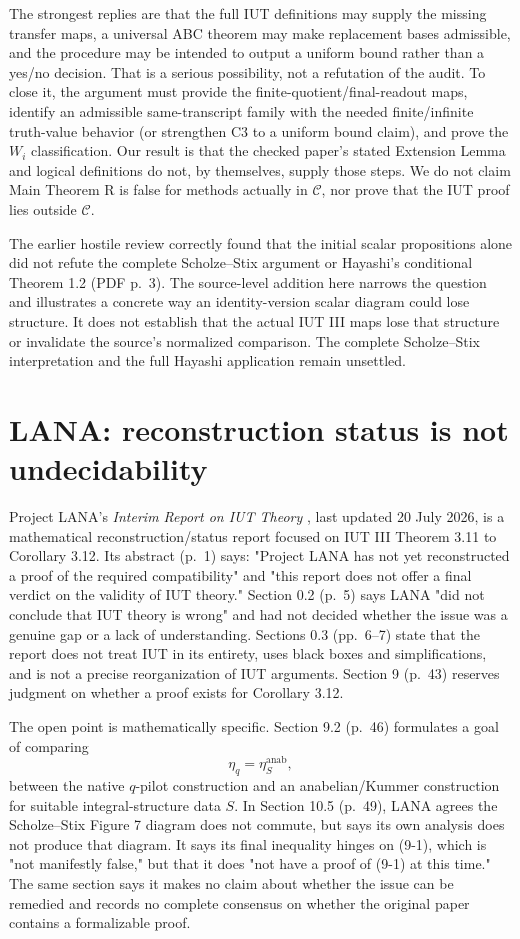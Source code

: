 \documentclass[11pt]{article}
\begin{document}
The strongest replies are that the full IUT definitions may supply the missing transfer maps, a universal ABC theorem may make replacement bases admissible, and the procedure may be intended to output a uniform bound rather than a yes/no decision. That is a serious possibility, not a refutation of the audit. To close it, the argument must provide the finite-quotient/final-readout maps, identify an admissible same-transcript family with the needed finite/infinite truth-value behavior (or strengthen C3 to a uniform bound claim), and prove the $W_i$ classification. Our result is that the checked paper's stated Extension Lemma and logical definitions do not, by themselves, supply those steps. We do not claim Main Theorem R is false for methods actually in $\mathcal C$, nor prove that the IUT proof lies outside $\mathcal C$.

The earlier hostile review correctly found that the initial scalar propositions alone did not refute the complete Scholze--Stix argument or Hayashi's conditional Theorem 1.2 (PDF p.~3). The source-level addition here narrows the question and illustrates a concrete way an identity-version scalar diagram could lose structure. It does not establish that the actual IUT III maps lose that structure or invalidate the source's normalized comparison. The complete Scholze--Stix interpretation and the full Hayashi application remain unsettled.


\section{LANA: reconstruction status is not undecidability}
Project LANA's \emph{Interim Report on IUT Theory} \cite[pp. 1, 5--7, 43, 46, 49]{LANA}, last updated 20 July 2026, is a mathematical reconstruction/status report focused on IUT III Theorem 3.11 to Corollary 3.12. Its abstract (p.~1) says: "Project LANA has not yet reconstructed a proof of the required compatibility" and "this report does not offer a final verdict on the validity of IUT theory." Section 0.2 (p.~5) says LANA "did not conclude that IUT theory is wrong" and had not decided whether the issue was a genuine gap or a lack of understanding. Sections 0.3 (pp.~6--7) state that the report does not treat IUT in its entirety, uses black boxes and simplifications, and is not a precise reorganization of IUT arguments. Section 9 (p.~43) reserves judgment on whether a proof exists for Corollary 3.12.

The open point is mathematically specific. Section 9.2 (p.~46) formulates a goal of comparing
\begin{equation}\label{eq:lana}\eta_q=\eta^{\mathrm{anab}}_S,\end{equation}
between the native $q$-pilot construction and an anabelian/Kummer construction for suitable integral-structure data $S$. In Section 10.5 (p.~49), LANA agrees the Scholze--Stix Figure 7 diagram does not commute, but says its own analysis does not produce that diagram. It says its final inequality hinges on (9-1), which is "not manifestly false," but that it does "not have a proof of (9-1) at this time." The same section says it makes no claim about whether the issue can be remedied and records no complete consensus on whether the original paper contains a formalizable proof.
\end{document}
